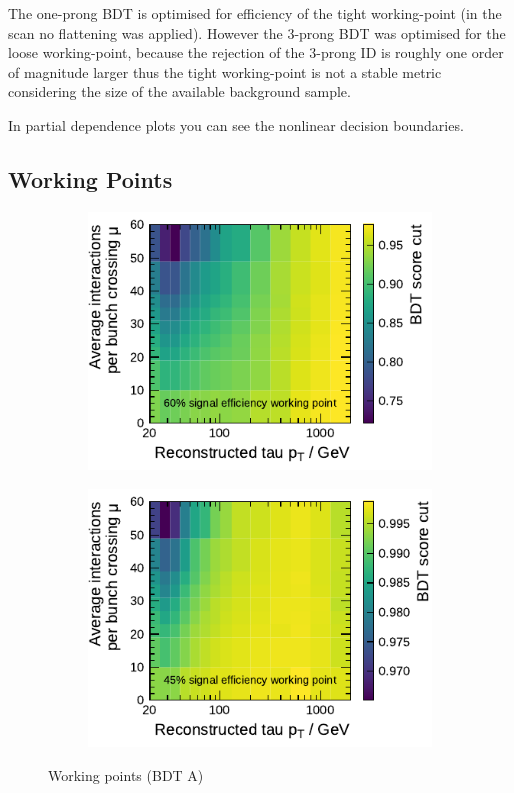 The one-prong BDT is optimised for efficiency of the tight working-point (in the
scan no flattening was applied). However the 3-prong BDT was optimised for the
loose working-point, because the rejection of the 3-prong ID is roughly one
order of magnitude larger thus the tight working-point is not a stable metric
considering the size of the available background sample.

In partial dependence plots you can see the nonlinear decision boundaries.

\subsection{Working Points}
\label{sec:bdt_working_points}

\begin{figure}[ht]
  \begin{subfigure}[t]{0.48\textwidth}
    \centering
    \includegraphics{./figures/bdt_perf/working_points/grid_1p_subsampling0269_wp.pdf}
  \end{subfigure}\hfill
  \begin{subfigure}[t]{0.48\textwidth}
    \centering
    \includegraphics{./figures/bdt_perf/working_points/grid_3p0327_wp.pdf}
  \end{subfigure}
  \caption{Working points (BDT A)}
\end{figure}


